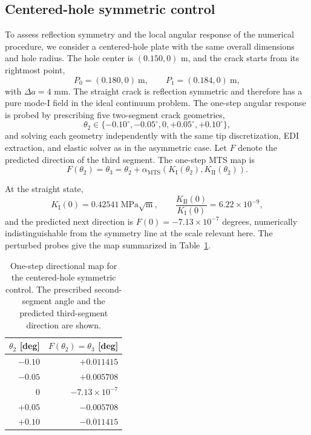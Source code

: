 \documentclass[11pt]{article}
\begin{document}
\subsection{Centered-hole symmetric control}
To assess reflection symmetry and the local angular response of the
numerical procedure, we consider a centered-hole plate with the same
overall dimensions and hole radius. The hole center is
$(0.150,0)$ m, and the crack starts from its rightmost point,
\[
 P_0=(0.180,0)\ \mathrm m,
 \qquad
 P_1=(0.184,0)\ \mathrm m,
\]
with $\Delta a=4$ mm. The straight crack is reflection symmetric
and therefore has a pure mode-I field in the ideal continuum problem.
The one-step angular response is probed by prescribing five
two-segment crack geometries,
\[
 \theta_2\in\{-0.10^\circ,-0.05^\circ,0,
                 +0.05^\circ,+0.10^\circ\},
\]
and solving each geometry independently with the same tip
discretization, EDI extraction, and elastic solver as in the
asymmetric case. Let $F$ denote the predicted direction of the
third segment. The one-step MTS map is
\begin{equation}
 F(\theta_2)=\theta_3
 =\theta_2+
 \alpha_{\mathrm{MTS}}\!\left(K_{\mathrm{I}}(\theta_2),K_{\mathrm{II}}(\theta_2)\right).
 \label{eq:symmetric-map}
\end{equation}

At the straight state,
\[
 K_{\mathrm{I}}(0)=0.42541\ \mathrm{MPa}\sqrt{\mathrm m},
 \qquad
 \frac{K_{\mathrm{II}}(0)}{K_{\mathrm{I}}(0)}=6.22\times10^{-9},
\]
and the predicted next direction is
$F(0)=-7.13\times10^{-7}$ degrees, numerically indistinguishable from the
symmetry line at the scale relevant here. The perturbed probes give the
map summarized in Table~\ref{tab:symmetric-stability}.

\begin{table}[H]
\centering
\small
\caption{One-step directional map for the centered-hole symmetric control.
The prescribed second-segment angle and the predicted third-segment direction are shown.}
\label{tab:symmetric-stability}
\begin{tabular}{rr}
\toprule
$\theta_2$ [deg] & $F(\theta_2)=\theta_3$ [deg]\\
\midrule
$-0.10$ & $+0.011415$\\
$-0.05$ & $+0.005708$\\
$0$     & $-7.13\times10^{-7}$\\
$+0.05$ & $-0.005708$\\
$+0.10$ & $-0.011415$\\
\bottomrule
\end{tabular}
\end{table}
\end{document}
